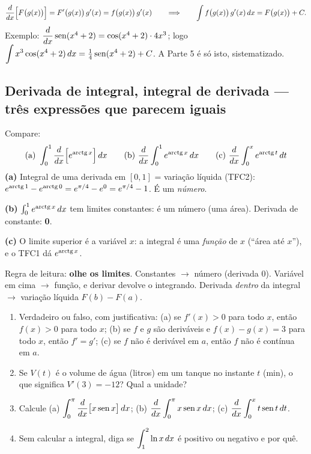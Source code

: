 \[
\frac{d}{dx}\Big[F\big(g(x)\big)\Big] = F'\big(g(x)\big)\,g'(x) = f\big(g(x)\big)\,g'(x)
\qquad\Longrightarrow\qquad
\int f\big(g(x)\big)\,g'(x)\,dx = F\big(g(x)\big)+C .
\]
Exemplo: $\dfrac{d}{dx}\operatorname{sen}(x^4+2) = \cos(x^4+2)\cdot 4x^3$; logo $\displaystyle\int x^3\cos(x^4+2)\,dx = \tfrac14\operatorname{sen}(x^4+2)+C$. A Parte 5 é só isto, sistematizado.

\subsection{Derivada de integral, integral de derivada --- três expressões que parecem iguais}

\begin{exemplo}
Compare:
\[
\text{(a) } \int_0^1 \frac{d}{dx}\Big[e^{\operatorname{arctg} x}\Big]\,dx
\qquad
\text{(b) } \frac{d}{dx}\int_0^1 e^{\operatorname{arctg} x}\,dx
\qquad
\text{(c) } \frac{d}{dx}\int_0^x e^{\operatorname{arctg} t}\,dt
\]
\textbf{(a)} Integral de uma derivada em $[0,1]$ = variação líquida (TFC2): $e^{\operatorname{arctg} 1}-e^{\operatorname{arctg} 0} = e^{\pi/4}-e^{0} = e^{\pi/4}-1$. É um \emph{número}.

\textbf{(b)} $\int_0^1 e^{\operatorname{arctg} x}\,dx$ tem limites constantes: é um número (uma área). Derivada de constante: \textbf{0}.

\textbf{(c)} O limite superior é a variável $x$: a integral é uma \emph{função} de $x$ (``área até $x$''), e o TFC1 dá $e^{\operatorname{arctg} x}$.

\medskip
Regra de leitura: \textbf{olhe os limites}. Constantes $\to$ número (derivada 0). Variável em cima $\to$ função, e derivar devolve o integrando. Derivada \emph{dentro} da integral $\to$ variação líquida $F(b)-F(a)$.
\end{exemplo}

\begin{exercicios}
\begin{enumerate}[leftmargin=1.6em, itemsep=2pt, label=\textbf{1.\arabic*}]
\item Verdadeiro ou falso, com justificativa: (a) se $f'(x)>0$ para todo $x$, então $f(x)>0$ para todo $x$; (b) se $f$ e $g$ são deriváveis e $f(x)-g(x)=3$ para todo $x$, então $f'=g'$; (c) se $f$ não é derivável em $a$, então $f$ não é contínua em $a$.
\item Se $V(t)$ é o volume de água (litros) em um tanque no instante $t$ (min), o que significa $V'(3)=-12$? Qual a unidade?
\item Calcule (a) $\displaystyle\int_0^{\pi}\frac{d}{dx}\big[x\operatorname{sen} x\big]\,dx$; \;(b) $\displaystyle\frac{d}{dx}\int_0^{\pi} x\operatorname{sen} x\,dx$; \;(c) $\displaystyle\frac{d}{dx}\int_0^{x} t\operatorname{sen} t\,dt$.
\item Sem calcular a integral, diga se $\displaystyle\int_1^2 \ln x\,dx$ é positivo ou negativo e por quê.
\end{enumerate}
\end{exercicios}
